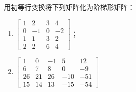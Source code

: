 \begin{problem}\label{problem-1.32}
用初等行变换将下列矩阵化为阶梯形矩阵：
\begin{enumerate}
    \item \(\begin{bmatrix}1&2&3&4\\0&-1&0&-2\\1&1&3&2\\2&2&6&4\end{bmatrix}\)；
    \item \(\begin{bmatrix}1&0&-1&5&12\\6&7&8&0&-9\\26&21&26&-10&-51\\15&14&13&-15&-54\end{bmatrix}\)
\end{enumerate}
\end{problem}
